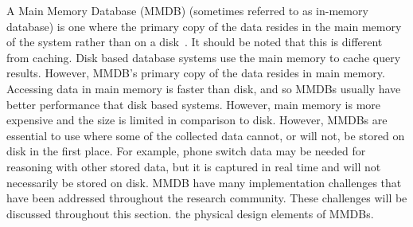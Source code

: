 \documentclass[12pt,a4paper]{article}
\begin{document}
A Main Memory Database (MMDB) (sometimes referred to as in-memory database) is one where the primary copy of the data resides in the main memory of the system
rather than on a
disk~\cite{garcia1992main}. It should be noted that this is different from caching. Disk based database systems use the main memory to cache query results.
However, MMDB's primary copy of the data resides in main memory. Accessing data in main memory is faster than disk, and so MMDBs usually have better
performance that disk based systems. However, main memory is more expensive and the size is limited in comparison to disk. However, MMDBs are essential to use
where some of the collected data cannot, or will not, be stored on disk in the first place. For example, phone switch data may be needed for reasoning with
other stored data, but it is captured in real time and will not necessarily be stored on disk. MMDB have many implementation challenges that have been addressed
throughout the research community. These challenges will be discussed throughout this section. %
the physical design elements of MMDBs.
\end{document}
